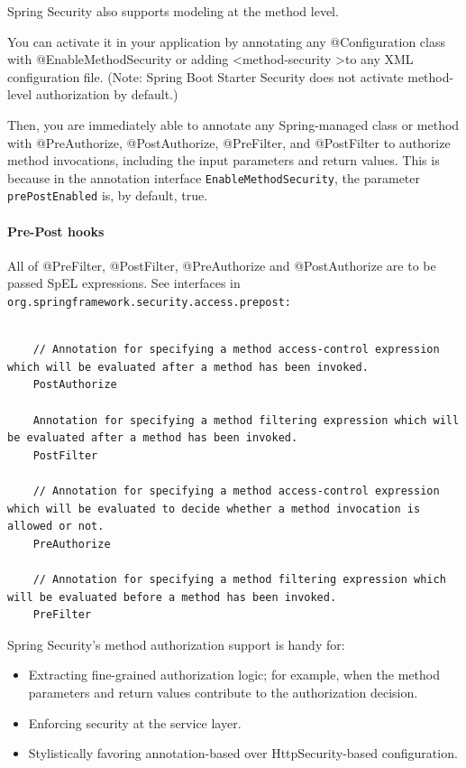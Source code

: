 \documentclass{scrartcl}
\begin{document}
Spring Security also supports modeling at the method level.

You can activate it in your application by annotating any @Configuration class with @EnableMethodSecurity or adding \textless method-security \textgreater  to any XML configuration file. (Note: Spring Boot Starter Security does not activate method-level authorization by default.)

Then, you are immediately able to annotate any Spring-managed class or method with @PreAuthorize, @PostAuthorize, @PreFilter, and @PostFilter to authorize method invocations, including the input parameters and return values. This is because in the annotation interface \lstinline|EnableMethodSecurity|, the parameter \lstinline|prePostEnabled| is, by default, true.

\paragraph{Pre-Post hooks}

All of @PreFilter, @PostFilter, @PreAuthorize and @PostAuthorize are to be passed SpEL expressions. See interfaces in \lstinline|org.springframework.security.access.prepost:|

\begin{lstlisting}

    // Annotation for specifying a method access-control expression which will be evaluated after a method has been invoked.
    PostAuthorize

    Annotation for specifying a method filtering expression which will be evaluated after a method has been invoked.
    PostFilter

    // Annotation for specifying a method access-control expression which will be evaluated to decide whether a method invocation is allowed or not.
    PreAuthorize

    // Annotation for specifying a method filtering expression which will be evaluated before a method has been invoked.
    PreFilter

\end{lstlisting}

Spring Security’s method authorization support is handy for:

\begin{itemize}
    \item Extracting fine-grained authorization logic; for example, when the method parameters and return values contribute to the authorization decision.
    \item Enforcing security at the service layer.
    \item Stylistically favoring annotation-based over HttpSecurity-based configuration.
\end{itemize}
\end{document}

